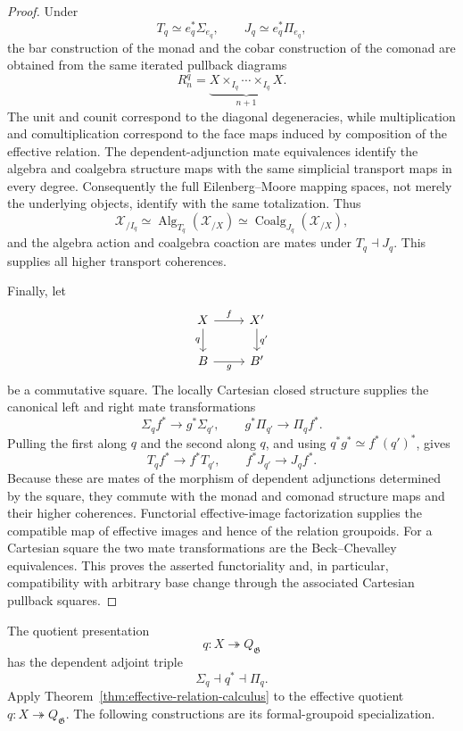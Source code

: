 \begin{proof}
Under
\[
    T_q\simeq e_q^*\Sigma_{e_q},
    \qquad
    J_q\simeq e_q^*\Pi_{e_q},
\]
the bar construction of the monad and the cobar construction of the comonad
are obtained from the same iterated pullback diagrams
\[
    R^q_n
    =
    \underbrace{
    X\times_{I_q}\cdots\times_{I_q}X
    }_{n+1}.
\]
The unit and counit correspond to the diagonal degeneracies, while
multiplication and comultiplication correspond to the face maps induced by
composition of the effective relation.  The dependent-adjunction mate
equivalences identify the algebra and coalgebra structure maps with the same
simplicial transport maps in every degree.  Consequently the full
Eilenberg--Moore mapping spaces, not merely the underlying objects, identify
with the same totalization.  Thus
\[
    \mathcal X_{/I_q}
    \simeq
    \operatorname{Alg}_{T_q}(\mathcal X_{/X})
    \simeq
    \operatorname{Coalg}_{J_q}(\mathcal X_{/X}),
\]
and the algebra action and coalgebra coaction are mates under
$T_q\dashv J_q$.  This supplies all higher transport coherences.

Finally, let
\[
\begin{tikzcd}
X \arrow[r,"f"] \arrow[d,"q"'] &
X' \arrow[d,"q'"]\\
B \arrow[r,"g"'] &
B'
\end{tikzcd}
\]
be a commutative square.  The locally Cartesian closed structure supplies the
canonical left and right mate transformations
\[
    \Sigma_q f^*\longrightarrow g^*\Sigma_{q'},
    \qquad
    g^*\Pi_{q'}\longrightarrow\Pi_qf^*.
\]
Pulling the first along $q$ and the second along $q$, and using
$q^*g^*\simeq f^*(q')^*$, gives
\[
    T_qf^*\longrightarrow f^*T_{q'},
    \qquad
    f^*J_{q'}\longrightarrow J_qf^*.
\]
Because these are mates of the morphism of dependent adjunctions determined
by the square, they commute with the monad and comonad structure maps and
their higher coherences.  Functorial effective-image factorization supplies
the compatible map of effective images and hence of the relation groupoids.
For a Cartesian square the two mate transformations are the
Beck--Chevalley equivalences.  This proves the asserted functoriality and, in
particular, compatibility with arbitrary base change through the associated
Cartesian pullback squares.
\end{proof}




The quotient presentation
\[
    q:X\twoheadrightarrow Q_{\mathfrak G}
\]
has the dependent adjoint triple
\[
    \Sigma_q
    \dashv
    q^*
    \dashv
    \Pi_q.
\]
Apply Theorem~\ref{thm:effective-relation-calculus} to the effective quotient
$q:X\twoheadrightarrow Q_{\mathfrak G}$.  The following constructions are its
formal-groupoid specialization.

